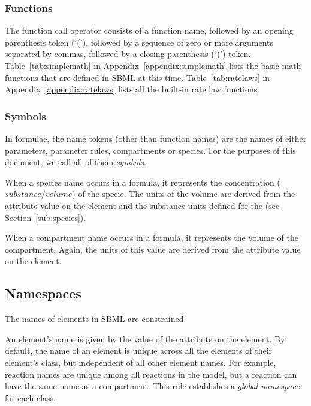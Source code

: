 \documentclass[10pt]{cek-article}
\begin{document}
\subsubsection{Functions}

The function call operator consists of a function name, followed by an
opening parenthesis token (`('), followed by a sequence of zero or more
arguments separated by commas, followed by a closing parenthesis (`)')
token.  Table~\ref{tab:simplemath} in Appendix~\ref{appendix:simplemath}
lists the basic math functions that are defined in SBML at this time.
Table~\ref{tab:ratelaws} in Appendix~\ref{appendix:ratelaws} lists all the
built-in rate law functions.

\subsubsection{Symbols}

In formulae, the name tokens (other than function names) are the names of
either parameters, parameter rules, compartments or species.  For the
purposes of this document, we call all of them \emph{symbols}.

When a species name occurs in a formula, it represents the concentration
($substance/volume$) of the specie.  The units of the volume are derived
from the  attribute value on the  element
and the substance units defined for the  (see
Section~\ref{sub:species}).

When a compartment name occurs in a formula, it represents the volume of
the compartment.  Again, the units of this value are derived from the
 attribute value on the  element.


\subsection{Namespaces}
\label{subsection:namespace}

The names of elements in SBML are constrained.

An element's name is given by the value of the  attribute on
the element.  By default, the name of an element is unique across all the
elements of their element's class, but independent of all other element
names.  For example, reaction names are unique among all reactions in the
model, but a reaction can have the same name as a compartment.  This rule
establishes a \emph{global namespace} for each class.
\end{document}

